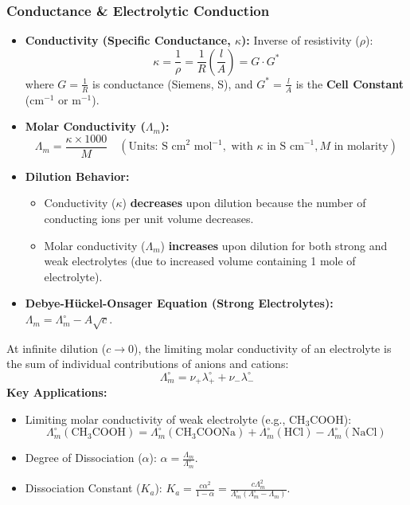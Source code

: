 \documentclass[11pt,a4paper]{article}
\begin{document}
\subsubsection{Conductance \& Electrolytic Conduction}
\begin{itemize}[leftmargin=1.5em, itemsep=2pt]
  \item \textbf{Conductivity (Specific Conductance, $\kappa$):} Inverse of resistivity ($\rho$):
  \[
    \kappa = \frac{1}{\rho} = \frac{1}{R} \left(\frac{l}{A}\right) = G \cdot G^*
  \]
  where $G = \frac{1}{R}$ is conductance (Siemens, S), and $G^* = \frac{l}{A}$ is the \textbf{Cell Constant} ($\text{cm}^{-1}$ or $\text{m}^{-1}$).
  \item \textbf{Molar Conductivity ($\Lambda_m$):}
  \[
    \Lambda_m = \frac{\kappa \times 1000}{M} \quad (\text{Units: } \text{S cm}^2 \text{ mol}^{-1}, \text{ with } \kappa \text{ in S cm}^{-1}, M \text{ in molarity})
  \]
  \item \textbf{Dilution Behavior:}
  \begin{itemize}[label=$\circ$]
    \item Conductivity ($\kappa$) \textbf{decreases} upon dilution because the number of conducting ions per unit volume decreases.
    \item Molar conductivity ($\Lambda_m$) \textbf{increases} upon dilution for both strong and weak electrolytes (due to increased volume containing 1 mole of electrolyte).
  \end{itemize}
  \item \textbf{Debye-Hückel-Onsager Equation (Strong Electrolytes):} $\Lambda_m = \Lambda^\circ_m - A \sqrt{c}$.
\end{itemize}

\begin{formulabox}
At infinite dilution ($c \to 0$), the limiting molar conductivity of an electrolyte is the sum of individual contributions of anions and cations:
\[
  \Lambda^\circ_m = \nu_+ \lambda^\circ_+ + \nu_- \lambda^\circ_-
\]
\textbf{Key Applications:}
\begin{itemize}[leftmargin=1.2em, itemsep=2pt]
  \item Limiting molar conductivity of weak electrolyte (e.g., $\text{CH}_3\text{COOH}$):
  \[
    \Lambda^\circ_m(\text{CH}_3\text{COOH}) = \Lambda^\circ_m(\text{CH}_3\text{COONa}) + \Lambda^\circ_m(\text{HCl}) - \Lambda^\circ_m(\text{NaCl})
  \]
  \item Degree of Dissociation ($\alpha$): $\alpha = \frac{\Lambda_m}{\Lambda^\circ_m}$.
  \item Dissociation Constant ($K_a$): $K_a = \frac{c \alpha^2}{1 - \alpha} = \frac{c \Lambda_m^2}{\Lambda^\circ_m (\Lambda^\circ_m - \Lambda_m)}$.
\end{itemize}
\end{formulabox}
\end{document}
